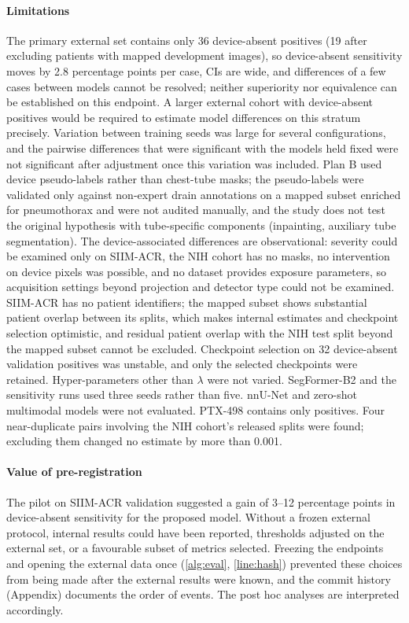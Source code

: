 \documentclass{ieeeaccess}
\begin{document}
\paragraph{Limitations}
The primary external set contains only 36 device-absent positives (19 after excluding patients with mapped development images), so device-absent sensitivity moves by 2.8 percentage points per case, CIs are wide, and differences of a few cases between models cannot be resolved; neither superiority nor equivalence can be established on this endpoint. A larger external cohort with device-absent positives would be required to estimate model differences on this stratum precisely. Variation between training seeds was large for several configurations, and the pairwise differences that were significant with the models held fixed were not significant after adjustment once this variation was included. Plan B used device pseudo-labels rather than chest-tube masks; the pseudo-labels were validated only against non-expert drain annotations on a mapped subset enriched for pneumothorax and were not audited manually, and the study does not test the original hypothesis with tube-specific components (inpainting, auxiliary tube segmentation). The device-associated differences are observational: severity could be examined only on SIIM-ACR, the NIH cohort has no masks, no intervention on device pixels was possible, and no dataset provides exposure parameters, so acquisition settings beyond projection and detector type could not be examined. SIIM-ACR has no patient identifiers; the mapped subset shows substantial patient overlap between its splits, which makes internal estimates and checkpoint selection optimistic, and residual patient overlap with the NIH test split beyond the mapped subset cannot be excluded. Checkpoint selection on 32 device-absent validation positives was unstable, and only the selected checkpoints were retained. Hyper-parameters other than $\lambda$ were not varied. SegFormer-B2 and the sensitivity runs used three seeds rather than five. nnU-Net and zero-shot multimodal models were not evaluated. PTX-498 contains only positives. Four near-duplicate pairs involving the NIH cohort's released splits were found; excluding them changed no estimate by more than 0.001.

\paragraph{Value of pre-registration}
The pilot on SIIM-ACR validation suggested a gain of 3--12 percentage points in device-absent sensitivity for the proposed model. Without a frozen external protocol, internal results could have been reported, thresholds adjusted on the external set, or a favourable subset of metrics selected. Freezing the endpoints and opening the external data once (\cref{alg:eval}, \cref{line:hash}) prevented these choices from being made after the external results were known, and the commit history (Appendix) documents the order of events. The post hoc analyses are interpreted accordingly.
\end{document}
